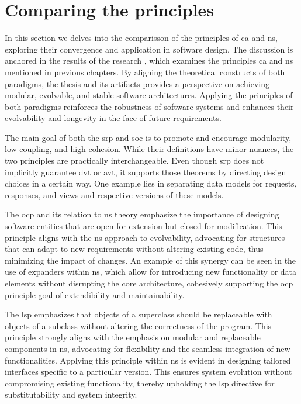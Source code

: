 \section{Comparing the principles} \label{subsec:converging_principles}

In this section we delves into the comparisson of the principles of \gls{ca} and \gls{ns},
exploring their convergence and application in software design. The discussion is anchored
in the results of the research  
\cite{koks_convergence_2023}, which examines the principles \gls{ca} and \gls{ns}
mentioned in previous chapters. By aligning the theoretical constructs of both paradigms,
the thesis and its artifacts provides a perspective on achieving modular, evolvable, and
stable software architectures. Applying the principles of both paradigms reinforces the
robustness of software systems and enhances their evolvability and longevity in the face
of future requirements.

The main goal of both the \gls{srp} and \gls{soc} is to promote and encourage modularity,
low coupling, and high cohesion. While their definitions have minor nuances, the two
principles are practically interchangeable. Even though \gls{srp} does not implicitly
guarantee \gls{dvt} or \gls{avt}, it supports those theorems by directing design choices
in a certain way. One example lies in separating data models for requests, responses, and
views and respective versions of these models.

The \gls{ocp} and its relation to \gls{ns} theory emphasize the importance of designing
software entities that are open for extension but closed for modification. This principle
aligns with the \gls{ns} approach to evolvability, advocating for structures that can
adapt to new requirements without altering existing code, thus minimizing the impact of
changes. An example of this synergy can be seen in the use of expanders within \gls{ns},
which allow for introducing new functionality or data elements without disrupting the core
architecture, cohesively supporting the \gls{ocp} principle goal of extendibility and
maintainability.

The \gls{lsp} emphasizes that objects of a superclass should be replaceable with objects
of a subclass without altering the correctness of the program. This principle strongly
aligns with the emphasis on modular and replaceable components in \gls{ns}, advocating for
flexibility and the seamless integration of new functionalities. Applying this principle
within \gls{ns} is evident in designing tailored interfaces specific to a particular
version. This ensures system evolution without compromising existing functionality,
thereby upholding the \gls{lsp} directive for substitutability and system integrity.

